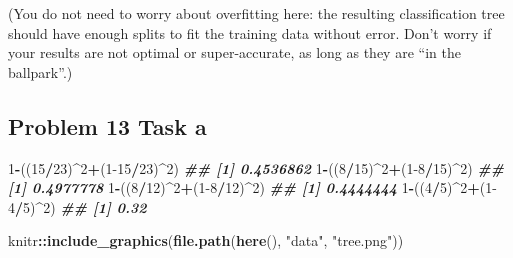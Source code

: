 \documentclass[
]{article}
\newenvironment{Shaded}{\begin{snugshade}}{\end{snugshade}}
\newcommand{\DecValTok}[1]{\textcolor[rgb]{0.00,0.00,0.81}{#1}}
\newcommand{\DocumentationTok}[1]{\textcolor[rgb]{0.56,0.35,0.01}{\textbf{\textit{#1}}}}
\newcommand{\FunctionTok}[1]{\textcolor[rgb]{0.13,0.29,0.53}{\textbf{#1}}}
\newcommand{\NormalTok}[1]{#1}
\newcommand{\SpecialCharTok}[1]{\textcolor[rgb]{0.81,0.36,0.00}{\textbf{#1}}}
\newcommand{\StringTok}[1]{\textcolor[rgb]{0.31,0.60,0.02}{#1}}
\begin{document}
(You do not need to worry about overfitting here: the resulting
classification tree should have enough splits to fit the training data
without error. Don't worry if your results are not optimal or
super-accurate, as long as they are ``in the ballpark''.)

\hypertarget{problem-13-task-a}{%
\subsection{Problem 13 Task a}\label{problem-13-task-a}}

\begin{Shaded}
\begin{Highlighting}[]
\DecValTok{1}\SpecialCharTok{{-}}\NormalTok{((}\DecValTok{15}\SpecialCharTok{/}\DecValTok{23}\NormalTok{)}\SpecialCharTok{\^{}}\DecValTok{2}\SpecialCharTok{+}\NormalTok{(}\DecValTok{1{-}15}\SpecialCharTok{/}\DecValTok{23}\NormalTok{)}\SpecialCharTok{\^{}}\DecValTok{2}\NormalTok{)}
\DocumentationTok{\#\# [1] 0.4536862}
\DecValTok{1}\SpecialCharTok{{-}}\NormalTok{((}\DecValTok{8}\SpecialCharTok{/}\DecValTok{15}\NormalTok{)}\SpecialCharTok{\^{}}\DecValTok{2}\SpecialCharTok{+}\NormalTok{(}\DecValTok{1{-}8}\SpecialCharTok{/}\DecValTok{15}\NormalTok{)}\SpecialCharTok{\^{}}\DecValTok{2}\NormalTok{)}
\DocumentationTok{\#\# [1] 0.4977778}
\DecValTok{1}\SpecialCharTok{{-}}\NormalTok{((}\DecValTok{8}\SpecialCharTok{/}\DecValTok{12}\NormalTok{)}\SpecialCharTok{\^{}}\DecValTok{2}\SpecialCharTok{+}\NormalTok{(}\DecValTok{1{-}8}\SpecialCharTok{/}\DecValTok{12}\NormalTok{)}\SpecialCharTok{\^{}}\DecValTok{2}\NormalTok{)}
\DocumentationTok{\#\# [1] 0.4444444}
\DecValTok{1}\SpecialCharTok{{-}}\NormalTok{((}\DecValTok{4}\SpecialCharTok{/}\DecValTok{5}\NormalTok{)}\SpecialCharTok{\^{}}\DecValTok{2}\SpecialCharTok{+}\NormalTok{(}\DecValTok{1{-}4}\SpecialCharTok{/}\DecValTok{5}\NormalTok{)}\SpecialCharTok{\^{}}\DecValTok{2}\NormalTok{)}
\DocumentationTok{\#\# [1] 0.32}
\end{Highlighting}
\end{Shaded}

\begin{Shaded}
\begin{Highlighting}[]
\NormalTok{knitr}\SpecialCharTok{::}\FunctionTok{include\_graphics}\NormalTok{(}\FunctionTok{file.path}\NormalTok{(}\FunctionTok{here}\NormalTok{(), }\StringTok{"data"}\NormalTok{, }\StringTok{"tree.png"}\NormalTok{)) }
\end{Highlighting}
\end{Shaded}
\end{document}
